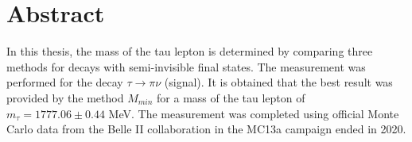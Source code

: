 
\newpage


\chapter{Abstract}

In this thesis, the mass of the tau lepton is determined by comparing three methods for decays with semi-invisible final states.
The measurement was performed for the decay \(\tau \rightarrow \pi \nu \) (signal). It is obtained that the best result was provided by the method \(M_{min}\) for a mass of the tau lepton of \(m _{\tau} = 1777.06 \pm 0.44\) MeV. The measurement was completed using official Monte Carlo data from the Belle II collaboration in the MC13a campaign ended in 2020. 
